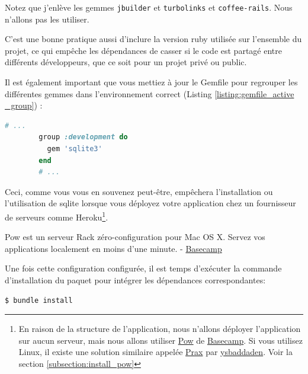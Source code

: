 \documentclass[]{report}
\begin{document}
        Notez que j'enlève les gemmes \verb|jbuilder| et \verb|turbolinks| et \verb|coffee-rails|. Nous n'allons pas les utiliser.

        C'est une bonne pratique aussi d'inclure la version ruby utilisée sur l'ensemble du projet, ce qui empêche les dépendances de casser si le code est partagé entre différents développeurs, que ce soit pour un projet privé ou public.

        Il est également important que vous mettiez à jour le Gemfile pour regrouper les différentes gemmes dans l'environnement correct (Listing \ref{listing:gemfile_active _group}) :

        \begin{scriptsize}
        \begin{lstlisting}[language=ruby, caption={Le Gemfile mis à jour pour différents groupes.}, label={listing:gemfile_active _group}, breaklines]
        # ...
        group :development do
          gem 'sqlite3'
        end
        # ...
        \end{lstlisting}
        \end{scriptsize}

        Ceci, comme vous vous en souvenez peut-être, empêchera l'installation ou l'utilisation de sqlite lorsque vous déployez votre application chez un fournisseur de serveurs comme Heroku\footnote{En raison de la structure de l'application, nous n'allons déployer l'application sur aucun serveur, mais nous allons utiliser \href{http://pow.cx/}{Pow} de \href{https://basecamp.com/}{Basecamp}. Si vous utilisez Linux, il existe une solution similaire appelée \href{https://github.com/ysbaddaden/prax.cr}{Prax} par \href{https://github.com/ysbaddaden}{ysbaddaden}. Voir la section \ref{subsection:install_pow}}.

        \begin{displayquote}
          Pow est un serveur Rack zéro-configuration pour Mac OS X. Servez vos applications localement en moins d'une minute. - \href{https://basecamp.com/}{Basecamp}
        \end{displayquote}

        Une fois cette configuration configurée, il est temps d'exécuter la commande d'installation du paquet pour intégrer les dépendances correspondantes:

        \begin{scriptsize}
        \begin{lstlisting}[language=bash, breaklines]
        $ bundle install
        \end{lstlisting}
        \end{scriptsize}
\end{document}
